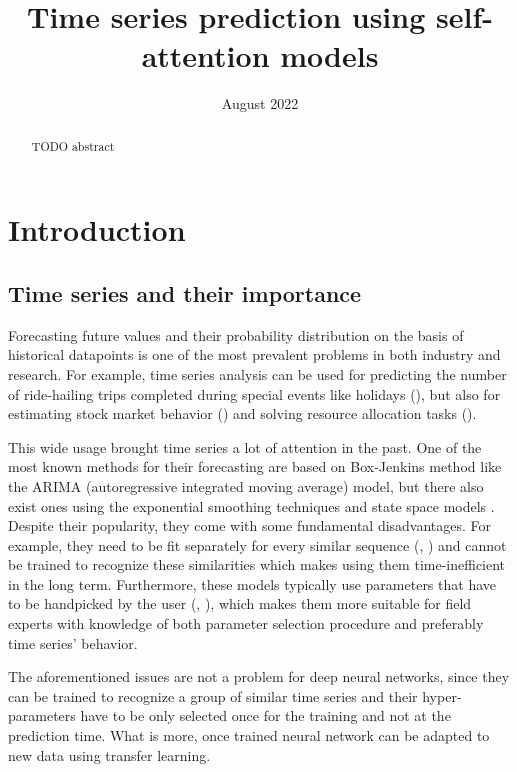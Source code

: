 \documentclass[en]{pracamgr}
\title{Time series prediction using self-attention models}
\date{August 2022}
\begin{document}
\maketitle

\begin{abstract}
  TODO abstract
\end{abstract}

\tableofcontents

\chapter*{Introduction}
\section*{Time series and their importance}\label{r:tsi}

Forecasting future values and their probability distribution on the basis of historical datapoints is one of the most prevalent problems in both industry and research.
For example, time series analysis can be used for predicting the number of ride-hailing trips completed during special events like holidays (\cite{uber}), but also for estimating stock market behavior (\cite{stock1}) and solving resource allocation tasks (\cite{graph-forecast}). 

This wide usage brought time series a lot of attention in the past. One of the most known methods for their forecasting are based on Box-Jenkins method like the ARIMA (autoregressive integrated moving average) \cite{arima} model, but there also exist ones using the exponential smoothing techniques and state space models \cite{ssm}. Despite their popularity, they come with some fundamental disadvantages. For example, they need to be fit separately for every similar sequence (\cite{enhancing}, \cite{deepar}) and cannot be trained to recognize these similarities which makes using them time-inefficient in the long term.
Furthermore, these models typically use parameters that have to be handpicked by the user (\cite{enhancing},
\cite{deepar}), which makes them more suitable for field experts with knowledge of both parameter selection procedure and preferably time series' behavior.


The aforementioned issues are not a problem for deep neural networks, since they can be trained to recognize a group of similar time series and their hyper-parameters have to be only selected once for the training and not at the prediction time. What is more, once trained neural network can be adapted to new data using transfer learning. 
\end{document}
